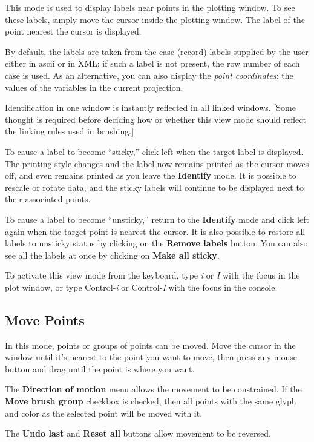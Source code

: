 \documentclass[11pt]{article}
\begin{document}
This mode is used to display labels near points in the plotting window.
To see these labels, simply move the cursor inside the plotting window.
The label of the point nearest the cursor is displayed.

By default, the labels are taken from the case (record) labels supplied
by the user either in ascii or in XML; if such a label is not present,
the row number of each case is used.   As an alternative, you can also
display the {\it point coordinates}: the values of the variables in the
current projection.

Identification in one window is instantly reflected in all linked windows.
[Some thought is required before deciding how or whether this view mode
should reflect the linking rules used in brushing.]

To cause a label to become ``sticky,'' click left when the target
label is displayed.  The printing style changes and the label now
remains printed as the cursor moves off, and even remains printed as
you leave the {\bf Identify} mode.  It is possible to rescale or
rotate data, and the sticky labels will continue to be displayed next
to their associated points.

To cause a label to become ``unsticky,'' return to the {\bf Identify}
mode and click left again when the target point is nearest the
cursor.  It is also possible to restore all labels to unsticky status
by clicking on the {\bf Remove labels} button.  You can also see all
the labels at once by clicking on {\bf Make all sticky}.

To activate this view mode from the keyboard, type {\em i} or {\em I}
with the focus in the plot window, or type Control-{\em i} or
Control-{\em I} with the focus in the console.

\subsection{Move Points}
\label{slbl:MovePoints}

In this mode, points or groups of points can be moved.  Move
the cursor in the window until it's nearest to the point you
want to move, then press any mouse button and drag until the
point is where you want.

The {\bf Direction of motion} menu allows the movement to be
constrained.  If the {\bf Move brush group} checkbox is
checked, then all points with the same glyph and color as
the selected point will be moved with it.

The {\bf Undo last} and {\bf Reset all} buttons allow movement
to be reversed.
\end{document}
